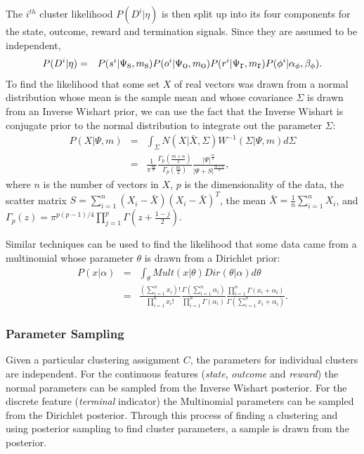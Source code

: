 The $i^{th}$ cluster likelihood $P(D^i|\eta)$ is then split up into its four components for the state, outcome, reward and termination signals. Since they are assumed to be independent, 
\begin{eqnarray*}
P(D^i|\eta)&=&P(s^i|\Psi_{\mbox s},m_{\mbox s})P(o^i|\Psi_{\mbox o},m_{\mbox o})P(r^i|\Psi_{\mbox r},m_{\mbox r})P(\phi^i|\alpha_\phi,\beta_\phi).
\end{eqnarray*}
To find the likelihood that some set $X$ of real vectors was drawn from a normal distribution whose mean is the sample mean and whose covariance $\Sigma$ is drawn from an Inverse Wishart prior, we can use the fact that the Inverse Wishart is conjugate prior to the normal distribution to integrate out the parameter $\Sigma$:
\begin{eqnarray}
\nonumber P(X|\Psi,m)&=&\int_\Sigma N(X|\bar X,\Sigma)W^{-1}(\Sigma|\Psi,m)d\Sigma\\
&=&\frac{1}{\pi^{\frac{np}{2}}}
\frac{\Gamma_p\left(\frac{m+n}{2}\right)}{\Gamma_p(\frac{m}{2})}
\frac{|\Psi|^{\frac{m}{2}}}{|\Psi+S|^{\frac{m+n}{2}}},\label{eq:iw}
\end{eqnarray}
where $n$ is the number of vectors in $X$, $p$ is the dimensionality of the data, the scatter matrix $S=\sum_{i=1}^n(X_i-\bar X)(X_i-\bar X)^T$, the mean $\bar X=\frac 1 n \sum_{i=1}^n X_i$, and $\Gamma_p(z)=\pi^{p(p-1)/4}\prod_{j=1}^p\Gamma\left(z+\frac {1-j} 2\right)$.

Similar techniques can be used to find the likelihood that some data came from a multinomial whose parameter $\theta$ is drawn from a Dirichlet prior:
\begin{eqnarray*}
P(x|\alpha) &=& \int_\theta Mult(x|\theta)Dir(\theta|\alpha)d\theta\\
&=&\frac{(\sum_{i=1}^n x_i)!}{\prod_{i=1}^n x_i!} \frac{\Gamma(\sum_{i=1}^n \alpha_i)}{\prod_{i=1}^n\Gamma(\alpha_i)} \frac{\prod_{i=1}^n\Gamma(x_i+\alpha_i)}{\Gamma(\sum_{i=1}^n x_i+\alpha_i)}.
\end{eqnarray*}
\subsubsection{Parameter Sampling}

Given a particular clustering assignment $C$, the parameters for individual clusters are independent. For the continuous features (\emph{state}, \emph{outcome} and \emph{reward}) the normal parameters can be sampled from the Inverse Wishart posterior. For the discrete feature (\emph{terminal} indicator) the Multinomial parameters can be sampled from the Dirichlet posterior. Through this process of finding a clustering and using posterior sampling to find cluster parameters, a sample is drawn from the  posterior.

